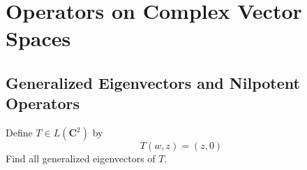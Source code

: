 \chapter{Operators on Complex Vector Spaces}

 \section{Generalized Eigenvectors and Nilpotent Operators}

 \begin{exercise}{1}
     Define $T \in L(\mathbf{C}^2)$ by
     $$T(w, z) = (z, 0)$$
     Find all generalized eigenvectors of $T$.
 \end{exercise}

 \begin{solution}


\end{solution}
